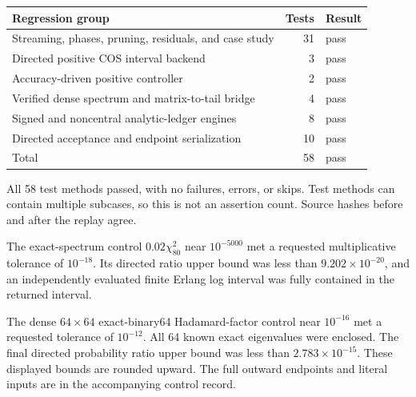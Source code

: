 \begin{center}
\begin{tabular}{@{}lrl@{}}
\toprule
Regression group & Tests & Result\\
\midrule
Streaming, phases, pruning, residuals, and case study & 31 & pass\\
Directed positive COS interval backend & 3 & pass\\
Accuracy-driven positive controller & 2 & pass\\
Verified dense spectrum and matrix-to-tail bridge & 4 & pass\\
Signed and noncentral analytic-ledger engines & 8 & pass\\
Directed acceptance and endpoint serialization & 10 & pass\\
\midrule
Total & 58 & pass\\
\bottomrule
\end{tabular}
\end{center}

All 58 test methods passed, with no failures, errors, or skips. Test methods
can contain multiple subcases, so this is not an assertion count. Source
hashes before and after the replay agree.

The exact-spectrum control $0.02\chi^2_{80}$ near $10^{-5000}$ met a
requested multiplicative tolerance of $10^{-18}$. Its directed ratio upper
bound was less than $9.202\times10^{-20}$, and an independently evaluated
finite Erlang log interval was fully contained in the returned interval.

The dense $64\times64$ exact-binary64 Hadamard-factor control near
$10^{-16}$ met a requested tolerance of $10^{-12}$. All 64 known exact
eigenvalues were enclosed. The final directed probability ratio upper bound
was less than $2.783\times10^{-15}$. These displayed bounds are rounded
upward. The full outward endpoints and literal inputs are in the accompanying
control record.
